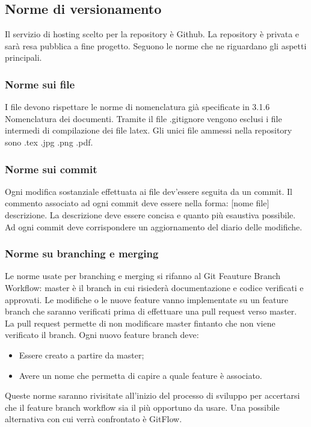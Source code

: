 \subsection{Norme di versionamento}
Il servizio di hosting scelto per la repository è Github. La repository è
privata e sarà resa pubblica a fine progetto. Seguono le norme che ne riguardano gli aspetti
principali.
\subsubsection{Norme sui file}
I file devono rispettare le norme di nomenclatura già specificate in 3.1.6 Nomenclatura dei documenti.
Tramite il file .gitignore vengono esclusi i file intermedi di compilazione dei file latex.
Gli unici file ammessi nella repository sono .tex .jpg .png .pdf.

\subsubsection{Norme sui commit}
Ogni modifica sostanziale effettuata ai file dev'essere seguita da un commit. Il commento associato ad ogni commit deve essere nella forma: [nome file] descrizione.
La descrizione deve essere concisa e quanto più esaustiva possibile. Ad ogni commit deve corrispondere un aggiornamento del diario delle modifiche.

\subsubsection{Norme su branching e merging}
Le norme usate per branching e merging si rifanno al Git Feauture Branch Workflow:
master è il branch in cui risiederà documentazione e codice verificati e approvati.
Le modifiche o le nuove feature vanno implementate su un feature branch che saranno verificati
prima di effettuare una pull request verso master.
La pull request permette di non modificare master fintanto che non viene verificato il branch.
Ogni nuovo feature branch deve:
\begin{itemize}
\item Essere creato a partire da master;
\item Avere un nome che permetta di capire a quale feature è associato.
\end{itemize}
Queste norme saranno rivisitate all'inizio del processo di sviluppo per accertarsi che il feature branch workflow sia il più opportuno da usare. Una possibile alternativa con cui verrà confrontato è GitFlow.

